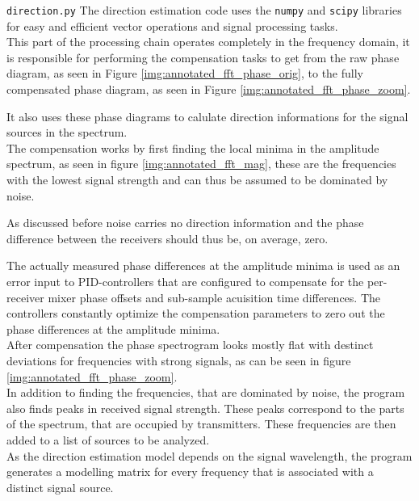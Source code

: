 \begin{subchapter}{\texttt{direction.py}}
  The direction estimation code uses the \texttt{numpy}
  \cite{numpyweb} and
  \texttt{scipy} \cite{scipyweb} libraries for easy and efficient
  vector operations and signal processing tasks. \\

  This part of the processing chain operates completely
  in the frequency domain, it is responsible for
  performing the compensation tasks to get from the
  raw phase diagram, as seen in Figure \ref{img:annotated_fft_phase_orig},
  to the fully compensated phase diagram,
  as seen in Figure \ref{img:annotated_fft_phase_zoom}.

  It also uses these phase diagrams to calulate direction informations
  for the signal sources in the spectrum. \\

  The compensation works by first finding the local minima in
  the amplitude spectrum, as seen in figure \ref{img:annotated_fft_mag},
  these are the frequencies with the lowest signal strength
  and can thus be assumed to be dominated by noise.

  As discussed before noise carries no direction
  information and the phase difference between the
  receivers should thus be, on average, zero.

  The actually measured phase differences at the amplitude minima
  is used as an error input to PID-controllers that
  are configured to compensate for the per-receiver
  mixer phase offsets and sub-sample acuisition
  time differences.
  The controllers constantly optimize the compensation
  parameters to zero out the phase differences at the
  amplitude minima. \\

  After compensation the phase spectrogram looks mostly
  flat with destinct deviations for frequencies
  with strong signals, as can be seen in
  figure \ref{img:annotated_fft_phase_zoom}. \\

  In addition to finding the frequencies, that are dominated
  by noise, the program also finds peaks in received signal strength.
  These peaks correspond to the parts of the spectrum, that are
  occupied by transmitters.
  These frequencies are then added to a list of sources to be
  analyzed. \\

  As the direction estimation model depends on the
  signal wavelength, the program generates a modelling matrix
  for every frequency that is associated with a distinct
  signal source. \\


\end{subchapter}
